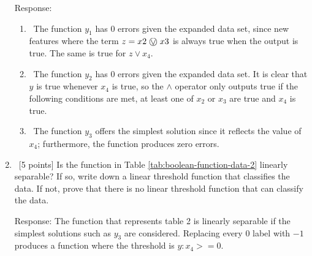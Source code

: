 \begin{enumerate}
  Response:
  \begin{enumerate}
  	\item ~The function $y_1$ has 0 errors given the expanded data set, since new features where the term $z = x2 \xor x3$ is always true when the output is true. The same is true for $z \lor x_4$.
  	\item ~The function $y_2$ has 0 errors given the expanded data set. It is clear that $y$ is true whenever $x_4$ is true, so the $\land$ operator only outputs true if the following conditions are met, at least one of $x_2$ or $x_3$ are true and $x_4$ is true.
 	\item ~The function $y_3$ offers the simplest solution since it reflects the value of $x_4$; furthermore, the function produces zero errors. 
  \end{enumerate}
\item ~[5 points] Is the function in Table
  \ref{tab:boolean-function-data-2} linearly separable? If so, write
  down a linear threshold function that classifies the data. If not,
  prove that there is no linear threshold function that can classify
  the data. \newline
	
  Response: The function that represents table 2 is linearly separable if the simplest solutions such as $y_3$ are considered. Replacing every $0$ label with $-1$ produces a function where the threshold is $y: x_4 >= 0$. 
\end{enumerate}

